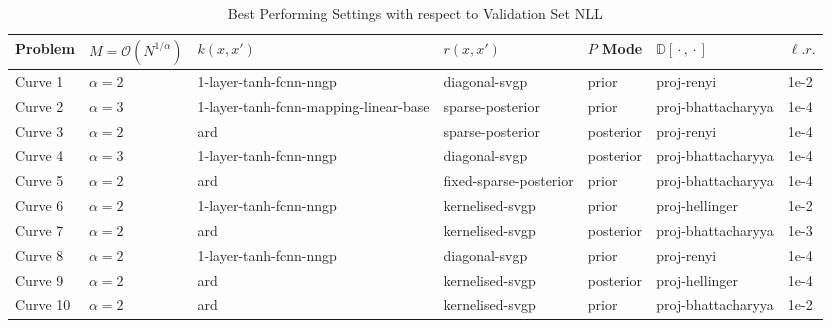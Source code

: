 \documentclass{article}
\newcommand{\wc}{\operatorname{{}\cdot{}}}
\numberwithin{equation}{section}
\begin{document}
\begin{table}[h!]
\tiny
\centering
\begin{tabular}{lllllll}
\toprule
Problem &  $M = \mathcal{O}(N^{1/\alpha})$  &                      $k(x, x')$ &       $r(x, x')$ & $P$ Mode &   $\mathbb{D}[\wc, \wc]$ &  $\ell. r.$ \\
\midrule
 Curve 1  &                       $\alpha=2$ &                1-layer-tanh-fcnn-nngp &          diagonal-svgp &          prior &         proj-renyi &      1e-2 \\
 Curve 2  &                       $\alpha=3$ & 1-layer-tanh-fcnn-mapping-linear-base &       sparse-posterior &          prior & proj-bhattacharyya &      1e-4 \\
 Curve 3  &                       $\alpha=2$ &                                  ard &       sparse-posterior &      posterior &         proj-renyi &      1e-4 \\
 Curve 4  &                       $\alpha=3$ &                1-layer-tanh-fcnn-nngp &          diagonal-svgp &      posterior & proj-bhattacharyya &      1e-4 \\
 Curve 5  &                       $\alpha=2$ &                                  ard & fixed-sparse-posterior &          prior & proj-bhattacharyya &      1e-4 \\
 Curve 6  &                       $\alpha=2$ &                1-layer-tanh-fcnn-nngp &        kernelised-svgp &          prior &     proj-hellinger &      1e-2 \\
 Curve 7  &                       $\alpha=2$ &                                  ard &        kernelised-svgp &      posterior & proj-bhattacharyya &      1e-3 \\
 Curve 8  &                       $\alpha=2$ &                1-layer-tanh-fcnn-nngp &          diagonal-svgp &          prior &         proj-renyi &      1e-4 \\
 Curve 9  &                       $\alpha=2$ &                                  ard &        kernelised-svgp &      posterior &     proj-hellinger &      1e-4 \\
 Curve 10 &                       $\alpha=2$ &                                  ard &        kernelised-svgp &          prior & proj-bhattacharyya &      1e-2 \\
\bottomrule
\end{tabular}
\caption{Best Performing Settings with respect to Validation Set NLL}
\label{table:toy-curve-configs}
\end{table}
\end{document}
